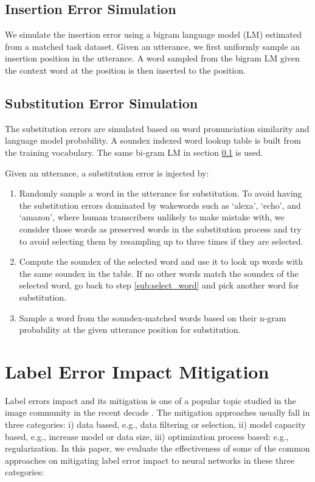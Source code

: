 \documentclass{article}
\begin{document}
\subsection{Insertion Error Simulation}\label{ins_sim}
We simulate the insertion error using a bigram language model (LM) estimated from a matched task dataset.
Given an utterance, we first uniformly sample an insertion position in the utterance. A word sampled from the bigram LM given the context word at the position is then inserted to the position.
\subsection{Substitution Error Simulation}\label{sub_sim}
The substitution errors are simulated based on word pronunciation similarity and language model probability. A soundex \cite{soundex} indexed word lookup table is built from the training vocabulary. The same bi-gram LM in section \ref{ins_sim} is used.

Given an utterance, a substitution error is injected by:

\begin{enumerate}
	\item \label{sub:select_word} Randomly sample a word in the utterance for substitution. To avoid having the substitution errors dominated by wakewords such as `alexa', `echo', and `amazon', where human transcribers unlikely to make mistake with, we consider those words as preserved words in the substitution process and try to avoid selecting them by resampling up to three times if they are selected.
	\item \label{sub:soundex} Compute the soundex of the selected word and use it to look up words with the same soundex in the table. If no other words match the soundex of the selected word, go back to step \ref{sub:select_word} and pick another word for substitution.
	\item \label{sub:substitue} Sample a word from the soundex-matched words based on their n-gram probability at the given utterance position for substitution.
\end{enumerate}


\section{Label Error Impact Mitigation}
Label errors impact and its mitigation is one of a popular topic studied in the image community in the recent decade \cite{Rolnick2017,Arplt2017,Reed2015,Goldberger2017,Patrini2017,Han2018,Yu2019,Jiang2018,Malach2017}. The mitigation approaches usually fall in three categories: i) data based, e.g., data filtering or selection, ii) model capacity based, e.g., increase model or data size, iii) optimization process based: e.g., regularization. In this paper, we evaluate the effectiveness of some of the common approaches on mitigating label error impact to neural networks in these three categories:
\end{document}
